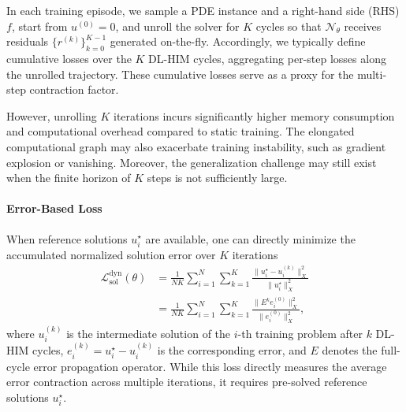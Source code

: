 \documentclass[11pt]{article}
\begin{document}
In each training episode, we sample a PDE instance and a right-hand side (RHS) $f$, start from $u^{(0)}=0$, and unroll the solver for $K$ cycles so that $\mathcal N_\theta$ receives residuals $\{r^{(k)}\}_{k=0}^{K-1}$ generated on-the-fly. Accordingly, we typically define cumulative losses over the $K$ DL-HIM cycles, aggregating per-step losses along the unrolled trajectory. These cumulative losses serve as a proxy for the multi-step contraction factor.

However, unrolling $K$ iterations incurs significantly higher memory consumption and computational overhead compared to static training. The elongated computational graph may also exacerbate training instability, such as gradient explosion or vanishing. Moreover, the generalization challenge may still exist when the finite horizon of $K$ steps is not sufficiently large.

\paragraph{Error-Based Loss}
When reference solutions $u_i^\star$ are available, one can directly minimize the accumulated normalized solution error over $K$ iterations
\begin{equation}
    \label{eq:dyn_loss_sol}
    \begin{aligned}
        \mathcal{L}_{\mathrm{sol}}^\mathrm{dyn}(\theta) & =\frac{1}{NK}\sum_{i=1}^{N}\sum_{k=1}^{K}\frac{\|u_{i}^{\star}-u_{i}^{(k)}\|_{X}^{2}}{\|u_{i}^{\star}\|_{X}^{2}}
        \\&=\frac{1}{NK}\sum_{i=1}^{N}\sum_{k=1}^{K}\frac{\|E^{k}e_i^{(0)}\|_{X}^{2}}{\|e_{i}^{(0)}\|_{X}^{2}},
    \end{aligned}
\end{equation}
where $u^{(k)}_i$ is the intermediate solution of the $i$-th training problem after $k$ DL-HIM cycles, $e_i^{(k)} = u_i^\star - u_i^{(k)}$ is the corresponding error, and $E$ denotes the full-cycle error propagation operator. While this loss directly measures the average error contraction across multiple iterations, it requires pre-solved reference solutions $u_i^\star$.
\end{document}
